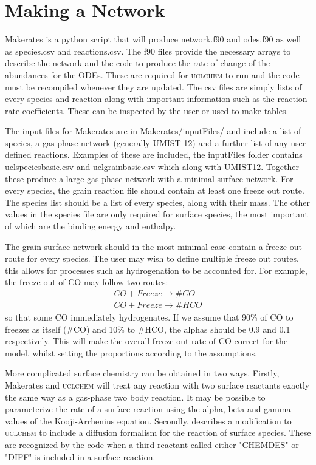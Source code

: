 \documentclass{llncs}
\begin{document}
\section{Making a Network}
\label{sec:network}
Makerates is a python script that will produce network.f90 and odes.f90 as well as species.csv and reactions.csv. The f90 files provide the necessary arrays to describe the network and the code to produce the rate of change of the abundances for the ODEs. These are required for \textsc{uclchem} to run and the code must be recompiled whenever they are updated. The csv files are simply lists of every species and reaction along with important information such as the reaction rate coefficients. These can be inspected by the user or used to make tables. \par
%
The input files for Makerates are in Makerates/inputFiles/ and include a list of species, a gas phase network (generally UMIST 12) and a further list of any user defined reactions. Examples of these are included, the inputFiles folder contains uclspeciesbasic.csv and uclgrainbasic.csv which along with UMIST12. Together these produce a large gas phase network with a minimal surface network. For every species, the grain reaction file should contain at least one freeze out route. The species list should be a list of every species, along with their mass. The other values in the species file are only required for surface species, the most important of which are the binding energy and enthalpy.\par
%
The grain surface network should in the most minimal case contain a freeze out route for every species. The user may wish to define multiple freeze out routes, this allows for processes such as hydrogenation to be accounted for. For example, the freeze out of CO may follow two routes:
\begin{eqnarray}
CO + Freeze \rightarrow \#CO \\
CO + Freeze \rightarrow \#HCO
\end{eqnarray}
 so that some CO immediately hydrogenates. If we assume that 90\% of CO to freezes as itself (\#CO) and 10\% to \#HCO, the alphas should be 0.9 and 0.1 respectively. This will make the overall freeze out rate of CO correct for the model, whilst setting the proportions according to the assumptions.\par
%
More complicated surface chemistry can be obtained in two ways. Firstly, Makerates and \textsc{uclchem} will treat any reaction with two surface reactants exactly the same way as a gas-phase two body reaction. It may be possible to parameterize the rate of a surface reaction using the alpha, beta and gamma values of the Kooji-Arrhenius equation. Secondly, \cite{Quenard2018} describes a modification to \textsc{uclchem} to include a diffusion formalism for the reaction of surface species. These are recognized by the code when a third reactant called either "CHEMDES" or "DIFF" is included in a surface reaction.\par
%
\end{document}
